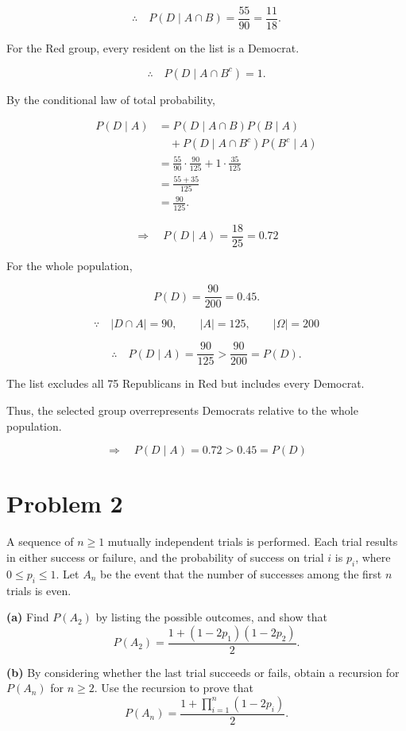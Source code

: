 \documentclass[11pt,a4paper]{article}
\begin{document}
\[
\therefore\quad
P(D\mid A\cap B)
=\frac{55}{90}
=\frac{11}{18}.
\]

For the Red group, every resident on the
list is a Democrat.

\[
\therefore\quad
P(D\mid A\cap B^c)=1.
\]

By the conditional law of total probability,

\[
\begin{aligned}
P(D\mid A)
&=P(D\mid A\cap B)P(B\mid A)\\
&\quad+
P(D\mid A\cap B^c)P(B^c\mid A)\\[4pt]
&=\frac{55}{90}\cdot\frac{90}{125}
 +1\cdot\frac{35}{125}\\[4pt]
&=\frac{55+35}{125}\\
&=\frac{90}{125}.
\end{aligned}
\]

\[
\Longrightarrow\quad
P(D\mid A)=\frac{18}{25}=0.72
\]

For the whole population,

\[
P(D)=\frac{90}{200}=0.45.
\]

\[
\because\quad
|D\cap A|=90,\qquad
|A|=125,\qquad
|\Omega|=200
\]

\[
\therefore\quad
P(D\mid A)=\frac{90}{125}
>
\frac{90}{200}=P(D).
\]

The list excludes all 75 Republicans in Red
but includes every Democrat.

Thus, the selected group overrepresents
Democrats relative to the whole population.

\[
\Longrightarrow\quad
P(D\mid A)=0.72>0.45=P(D)
\]


\section*{Problem 2}

A sequence of $n\geq 1$ mutually independent trials is
performed. Each trial results in either success or failure,
and the probability of success on trial $i$ is $p_i$,
where $0\leq p_i\leq 1$.
Let $A_n$ be the event that the number of successes
among the first $n$ trials is even.

\textbf{(a)}
Find $P(A_2)$ by listing the possible outcomes,
and show that
\[
P(A_2)=
\frac{1+(1-2p_1)(1-2p_2)}{2}.
\]

\textbf{(b)}
By considering whether the last trial succeeds or fails,
obtain a recursion for $P(A_n)$ for $n\geq 2$.
Use the recursion to prove that
\[
P(A_n)=
\frac{1+\prod_{i=1}^{n}(1-2p_i)}{2}.
\]
\end{document}

